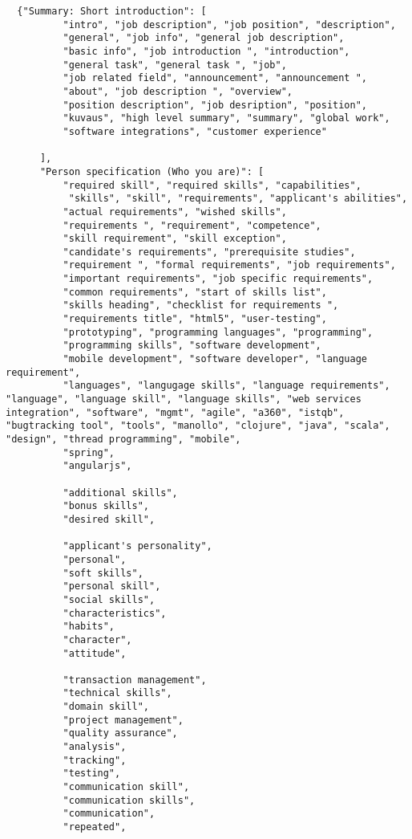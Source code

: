 \begin{verbatim}
  {"Summary: Short introduction": [
          "intro", "job description", "job position", "description",
          "general", "job info", "general job description",
          "basic info", "job introduction ", "introduction",
          "general task", "general task ", "job",
          "job related field", "announcement", "announcement ",
          "about", "job description ", "overview",
          "position description", "job desription", "position",
          "kuvaus", "high level summary", "summary", "global work",
          "software integrations", "customer experience"

      ],
      "Person specification (Who you are)": [
          "required skill", "required skills", "capabilities",
           "skills", "skill", "requirements", "applicant's abilities",
          "actual requirements", "wished skills",
          "requirements ", "requirement", "competence",
          "skill requirement", "skill exception",
          "candidate's requirements", "prerequisite studies",
          "requirement ", "formal requirements", "job requirements",
          "important requirements", "job specific requirements",
          "common requirements", "start of skills list",
          "skills heading", "checklist for requirements ",
          "requirements title", "html5", "user-testing",
          "prototyping", "programming languages", "programming",
          "programming skills", "software development",
          "mobile development", "software developer", "language requirement",
          "languages", "langugage skills", "language requirements", "language", "language skill", "language skills", "web services integration", "software", "mgmt", "agile", "a360", "istqb", "bugtracking tool", "tools", "manollo", "clojure", "java", "scala", "design", "thread programming", "mobile",
          "spring",
          "angularjs",

          "additional skills",
          "bonus skills",
          "desired skill",

          "applicant's personality",
          "personal",
          "soft skills",
          "personal skill",
          "social skills",
          "characteristics",
          "habits",
          "character",
          "attitude",

          "transaction management",
          "technical skills",
          "domain skill",
          "project management",
          "quality assurance",
          "analysis",
          "tracking",
          "testing",
          "communication skill",
          "communication skills",
          "communication",
          "repeated",


\end{verbatim}

